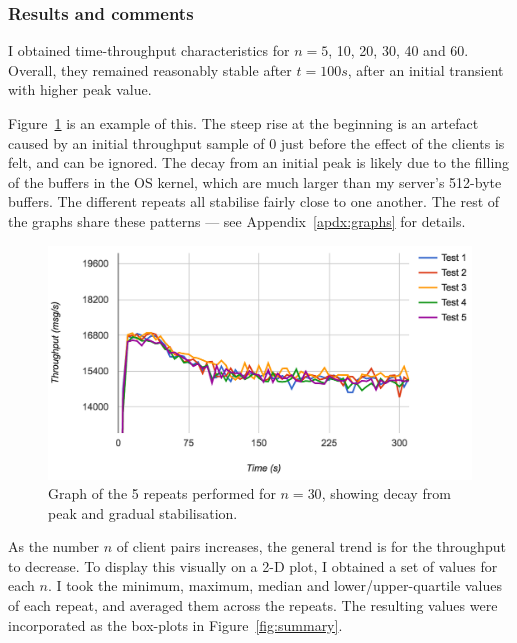 \documentclass[12pt,a4paper,twoside,openright]{report}
\begin{document}
{\subsubsection{Results and comments}
I obtained time-throughput characteristics for $n=5$, 10, 20, 30, 40 and 60. Overall, they remained reasonably stable after $t=100s$, after an initial transient with higher peak value.

Figure~\ref{fig:example-chstic} is an example of this. The steep rise at the beginning is an artefact caused by an initial throughput sample of $0$ just before the effect of the clients is felt, and can be ignored. The decay from an initial peak is likely due to the filling of the buffers in the OS kernel, which are much larger than my server's 512-byte buffers. The different repeats all stabilise fairly close to one another. The rest of the graphs share these patterns --- see Appendix~\ref{apdx:graphs} for details.

\begin{figure}
  \centering\includegraphics[width=\textwidth]{../transcripts/lipsum/30n30/cold.png}
  \caption{Graph of the 5 repeats performed for $n=30$, showing decay from peak and gradual stabilisation.}
  \label{fig:example-chstic}
\end{figure}

As the number $n$ of client pairs increases, the general trend is for the throughput to decrease. To display this visually on a 2-D plot, I obtained a set of values for each $n$. I took the minimum, maximum, median and lower/upper-quartile values of each repeat, and averaged them across the repeats. The resulting values were incorporated as the box-plots in Figure~\ref{fig:summary}.

}
\end{document}
